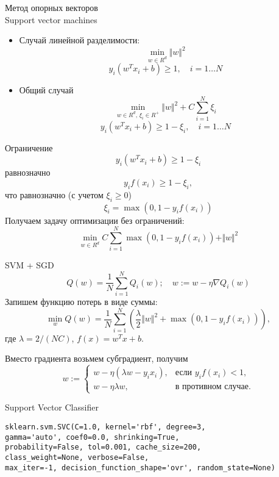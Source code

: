 \documentclass[landscape]{slides}
\begin{document}
\begin{slide}
Метод опорных векторов\\
Support vector machines

\begin{itemize}
\item Случай линейной разделимости:
$$ \min_{w\in R^d} \Vert w \Vert^2 $$
$$ y_i(w^T x_i + b) \geq 1,\quad i=1\ldots N$$
\item Общий случай
$$ \min_{w\in R^d,\,\xi_i\in R^+} \Vert w \Vert^2 + C \sum_{i=1}^N \xi_i $$
$$ y_i(w^T x_i + b) \geq 1-\xi_i,\quad i=1\ldots N$$
\end{itemize}

\end{slide}


\begin{slide}
Ограничение
$$ y_i(w^T x_i + b) \geq 1-\xi_i$$
равнозначно
$$ y_i f(x_i) \geq 1-\xi_i,$$
что равнозначно (с учетом $\xi_i\geq 0$)
$$ \xi_i = \max(0, 1-y_i f(x_i)) $$
Получаем задачу оптимизации без ограничений:
$$ \min_{w\in R^d} C \sum_{i=1}^N \max(0, 1-y_i f(x_i)) + \Vert w \Vert^2 $$
\end{slide}

\begin{slide}
SVM + SGD
$$ Q(w) = \frac 1N \sum_{i=1}^N Q_i(w);
\quad w:= w - \eta \nabla Q_i(w) $$
Запишем функцию потерь в виде суммы:
$$ \min_w Q(w) = \frac 1N \sum_{i=1}^N
\left(\frac\lambda 2 \Vert w\Vert^2 + \max(0, 1-y_i f(x_i))\right),$$
где $\lambda = 2/(NC)$, $f(x) = w^Tx+b$.

Вместо градиента возьмем субградиент, получим
$$ w := \left\{
\begin{array}{ll}
w - \eta(\lambda w - y_i x_i), & \mbox{если } y_i f(x_i) < 1, \\
w - \eta \lambda w, & \mbox{в противном случае}.
\end{array}
\right.
$$
\end{slide}


\begin{slide}
Support Vector Classifier
\begin{verbatim}
sklearn.svm.SVC(C=1.0, kernel='rbf', degree=3,
gamma='auto', coef0=0.0, shrinking=True,
probability=False, tol=0.001, cache_size=200,
class_weight=None, verbose=False,
max_iter=-1, decision_function_shape='ovr', random_state=None)
\end{verbatim}
\end{slide}
\end{document}
